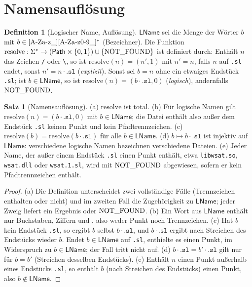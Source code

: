 \documentclass[a4paper,12pt,twoside]{report}
\DeclareRobustCommand{\_}{\ifmmode\mbox{\textunderscore}\else\textunderscore\allowbreak{}\fi}
\theoremstyle{definition}
\newtheorem{definition}{Definition}[chapter]
\newtheorem{satz}{Satz}[chapter]
\newcommand{\Path}{\mathsf{Path}}
\begin{document}
\section{Namensauflösung}

\begin{definition}[Logischer Name, Auflösung]
	\label{def:resolve}
	$\mathsf{LName}$ sei die Menge der Wörter $b$ mit $b\in[\mathrm{A\text{-}Za\text{-}z\_}][\mathrm{A\text{-}Za\text{-}z0\text{-}9\_}]^*$ (Bezeichner). Die Funktion $\mathrm{resolve}:\Sigma^*\to(\Path\times\{0,1\})\cup\{\mathrm{NOT\_FOUND}\}$ ist definiert durch: Enthält $n$ das Zeichen \texttt{/} oder \texttt{\textbackslash}, so ist $\mathrm{resolve}(n)=(n',1)$ mit $n'=n$, falls $n$ auf \texttt{.sl} endet, sonst $n'=n\cdot\texttt{.sl}$ (\emph{explizit}). Sonst sei $b=n$ ohne ein etwaiges Endstück \texttt{.sl}; ist $b\in\mathsf{LName}$, so ist $\mathrm{resolve}(n)=(b\cdot\texttt{.sl},0)$ (\emph{logisch}), andernfalls $\mathrm{NOT\_FOUND}$.
\end{definition}

\begin{satz}[Namensauflösung]
	\label{satz:namen}
	(a) $\mathrm{resolve}$ ist total. (b) Für logische Namen gilt $\mathrm{resolve}(n)=(b\cdot\texttt{.sl},0)$ mit $b\in\mathsf{LName}$; die Datei enthält also außer dem Endstück \texttt{.sl} keinen Punkt und kein Pfadtrennzeichen. (c) $\mathrm{resolve}(b)=\mathrm{resolve}(b\cdot\texttt{.sl})$ für alle $b\in\mathsf{LName}$. (d) $b\mapsto b\cdot\texttt{.sl}$ ist injektiv auf $\mathsf{LName}$: verschiedene logische Namen bezeichnen verschiedene Dateien. (e) Jeder Name, der außer einem Endstück \texttt{.sl} einen Punkt enthält, etwa \texttt{libwsat.so}, \texttt{wsat.dll} oder \texttt{wsat.1.sl}, wird mit $\mathrm{NOT\_FOUND}$ abgewiesen, sofern er kein Pfadtrennzeichen enthält.
\end{satz}

\begin{proof}
	(a) Die Definition unterscheidet zwei vollständige Fälle (Trennzeichen enthalten oder nicht) und im zweiten Fall die Zugehörigkeit zu $\mathsf{LName}$; jeder Zweig liefert ein Ergebnis oder $\mathrm{NOT\_FOUND}$. (b) Ein Wort aus $\mathsf{LName}$ enthält nur Buchstaben, Ziffern und \texttt{\_}, also weder Punkt noch Trennzeichen. (c) Hat $b$ kein Endstück \texttt{.sl}, so ergibt $b$ selbst $b\cdot\texttt{.sl}$, und $b\cdot\texttt{.sl}$ ergibt nach Streichen des Endstücks wieder $b$. Endet $b\in\mathsf{LName}$ auf \texttt{.sl}, enthielte es einen Punkt, im Widerspruch zu $b\in\mathsf{LName}$; der Fall tritt nicht auf. (d) $b\cdot\texttt{.sl}=b'\cdot\texttt{.sl}$ gilt nur für $b=b'$ (Streichen desselben Endstücks). (e) Enthält $n$ einen Punkt außerhalb eines Endstücks \texttt{.sl}, so enthält $b$ (nach Streichen des Endstücks) einen Punkt, also $b\notin\mathsf{LName}$.
\end{proof}
\end{document}
